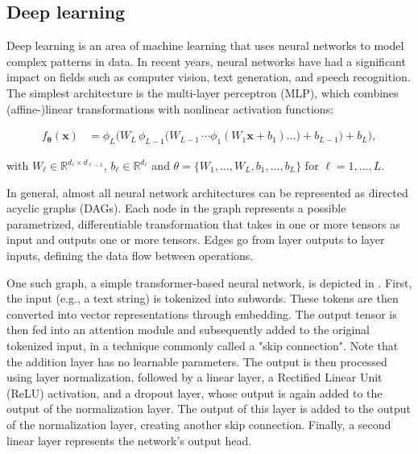 \documentclass[article]{jss}
\theoremstyle{definition}
\begin{document}
\subsection{Deep learning}\label{sec:background_dl}

Deep learning is an area of machine learning that uses neural networks to model complex patterns in data.
In recent years, neural networks have had a significant impact on fields such as computer vision, text generation, and speech recognition.
The simplest architecture is the multi-layer perceptron (MLP), which combines (affine-)linear transformations with nonlinear activation functions:

\begin{align}
f_{\boldsymbol{\theta}}(\mathbf{x}) &=
  \phi_{L}\!\bigl(
    W_{L}\,\phi_{L-1}\!\bigl(
      W_{L-1}\,\dotsm\phi_{1}(W_{1}\mathbf{x}+b_{1}) \ldots )+ b_{L - 1}
    \bigr)+b_{L}
  \bigr),
\end{align}

\noindent
with \(W_{\ell}\in\mathbb{R}^{d_{\ell}\times d_{\ell-1}}\), \(b_{\ell}\in\mathbb{R}^{d_{\ell}}\) and \(\theta = \{W_1, \ldots, W_L, b_1, \ldots, b_L\}\) for \(\ell=1,\dots,L\).

In general, almost all neural network architectures can be represented as directed acyclic graphs (DAGs).
Each node in the graph represents a possible parametrized, differentiable transformation that takes in one or more tensors as input and outputs one or more tensors.
Edges go from layer outputs to layer inputs, defining the data flow between operations.

One such graph, a simple transformer-based neural network, is depicted in .
First, the input (e.g., a text string) is tokenized into subwords. These tokens are then converted into vector representations through embedding.
The output tensor is then fed into an attention module and subsequently added to the original tokenized input, in a technique commonly called a "skip connection".
Note that the addition layer has no learnable parameters.
The output is then processed using layer normalization, followed by a linear layer, a Rectified Linear Unit (ReLU) activation, and a dropout layer, whose output is again added to the output of the normalization layer.
The output of this layer is added to the output of the normalization layer, creating another skip connection.
Finally, a second linear layer represents the network's output head.
\end{document}
